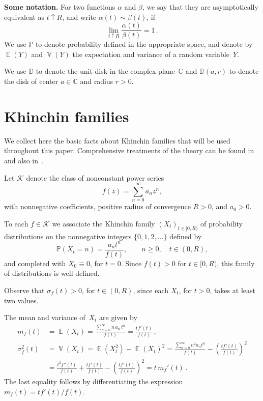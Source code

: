 \documentclass[12pt]{amsart}
\theoremstyle{definition}
\DeclareMathOperator{\E}{\mathbb{E}}
\DeclareMathOperator{\Var}{\mathbb{V}}
\begin{document}
\medskip

\noindent\textbf{Some notation.}
For two functions $\alpha$ and $\beta$, we say that they are asymptotically
equivalent as $t\uparrow R$, and write $\alpha(t)\sim\beta(t)$, if
\[
\lim_{t\uparrow R} \frac{\alpha(t)}{\beta(t)} = 1\,.
\]
We use $\mathbb{P}$ to denote probability defined in the appropriate space, and denote by $\E(Y)$
and $\Var(Y)$ the expectation and variance of a random variable~$Y$.
\smallskip

We use $\mathbb{D}$ to denote the unit disk in the complex plane~$\mathbb{C}$ and $\mathbb{D}(a,r)$ to denote the
disk of center $a\in\mathbb{C}$ and radius $r>0$.


\section{Khinchin families}\label{sec:Khinchin}

We collect here the basic facts about Khinchin families that will be used throughout
this paper. Comprehensive treatments of the theory can be found in~\cite{CFMK, CFMK2, CFMK3} and also
in~\cite{MaciaThesis, MaciaGaussianity}.
\smallskip

Let $\mathcal{K}$ denote the class of nonconstant power series
\[
f(z) = \sum_{n=0}^{\infty} a_n z^n,
\]
with nonnegative coefficients, positive radius of convergence $R>0$, and $a_0>0$.
\smallskip

To each $f\in\mathcal{K}$ we associate the Khinchin family $(X_t)_{t\in[0,R)}$ of probability distributions
on the nonnegative integers $\{0,1,2,\ldots\}$ defined by
\[
\mathbb{P}(X_t = n) = \frac{a_n t^n}{f(t)}, \qquad n\ge 0,\quad t\in(0,R),
\]
and completed with $X_0\equiv 0$, for $t=0$. Since $f(t)>0$ for $t\in[0,R)$, this family of
distributions is well defined.
\smallskip

Observe that $\sigma_f(t)>0$, for $t\in(0,R)$, since each $X_t$, for $t>0$, takes at least two
values.

The mean and variance of~$X_t$ are given by
\begin{equation}\label{eq:meanvar}
\begin{aligned}
m_f(t) &= \E(X_t) = \frac{\displaystyle\sum_{n=0}^{\infty} n\, a_n\, t^n}{f(t)} = \frac{t f'(t)}{f(t)}\,,\\[6pt]
\sigma_f^2(t) &= \Var(X_t) = \E(X_t^2) - \E(X_t)^2 = \frac{\displaystyle\sum_{n=0}^{\infty} n^2 a_n t^n}{f(t)} - \left(\frac{t f'(t)}{f(t)}\right)^{\!2}\\[4pt]
&= \frac{t^2 f''(t)}{f(t)} + \frac{t f'(t)}{f(t)} - \left(\frac{t f'(t)}{f(t)}\right)^{\!2} = t\, m_f'(t)\,.
\end{aligned}
\end{equation}
The last equality follows by differentiating the expression $m_f(t)=tf'(t)/f(t)$.
\smallskip
\end{document}
